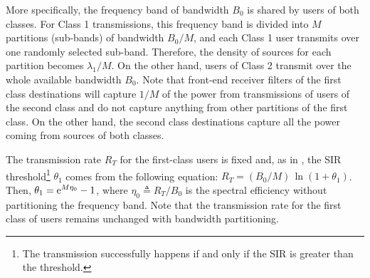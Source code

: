 
More specifically, the frequency band of bandwidth $B_0$ is shared by users of both classes. For Class 1 transmissions, this frequency band is divided into $M$ partitions (sub-bands) of bandwidth $B_0/M$, and each Class 1 user transmits over one randomly selected sub-band. Therefore, the density of sources for each partition becomes $\lambda_1/M$. On the other hand, users of Class 2 transmit over the whole available bandwidth $B_0$.
%
Note that front-end receiver filters of the first class destinations will capture $1/M$ of the power from transmissions of users of the second class and do not capture anything from other partitions of the first class. On the other hand, the second class destinations capture all the power coming from sources of both classes.

The transmission rate $R_T$ for the first-class users is fixed and, as in \cite{jindal2008bandwidth}, the SIR threshold\footnote{The transmission successfully happens if and only if the SIR is greater than the threshold.} $\theta_1$ comes from the following equation: ${R_T = (B_0/M)\,\ln(1+\theta_1)}$. Then, ${\theta_1 = \mathrm{e}^{M\eta_0}-1}$, where ${\eta_0 \triangleq R_T/B_0}$ is the spectral efficiency without partitioning the frequency band. Note that the transmission rate for the first class of users remains unchanged with bandwidth partitioning.


